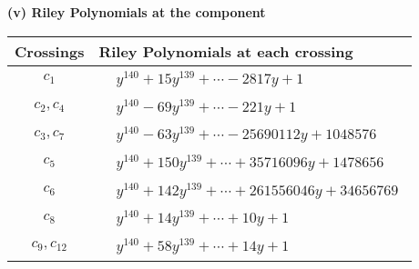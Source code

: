 \documentclass[1p]{elsarticle_modified}
\theoremstyle{definition}
\begin{document}
\newpage\renewcommand{\arraystretch}{1}
\flushleft \textbf{(v) Riley Polynomials at the component}\newline \\
\begin{tabular}{m{50pt}|m{274pt}}
Crossings & \hspace{64pt}Riley Polynomials at each crossing \\
\hline $$\begin{aligned}c_{1}\end{aligned}$$&$\begin{aligned}
&y^{140}+15 y^{139}+\cdots-2817 y+1
\end{aligned}$\\
\hline $$\begin{aligned}c_{2},c_{4}\end{aligned}$$&$\begin{aligned}
&y^{140}-69 y^{139}+\cdots-221 y+1
\end{aligned}$\\
\hline $$\begin{aligned}c_{3},c_{7}\end{aligned}$$&$\begin{aligned}
&y^{140}-63 y^{139}+\cdots-25690112 y+1048576
\end{aligned}$\\
\hline $$\begin{aligned}c_{5}\end{aligned}$$&$\begin{aligned}
&y^{140}+150 y^{139}+\cdots+35716096 y+1478656
\end{aligned}$\\
\hline $$\begin{aligned}c_{6}\end{aligned}$$&$\begin{aligned}
&y^{140}+142 y^{139}+\cdots+261556046 y+34656769
\end{aligned}$\\
\hline $$\begin{aligned}c_{8}\end{aligned}$$&$\begin{aligned}
&y^{140}+14 y^{139}+\cdots+10 y+1
\end{aligned}$\\
\hline $$\begin{aligned}c_{9},c_{12}\end{aligned}$$&$\begin{aligned}
&y^{140}+58 y^{139}+\cdots+14 y+1
\end{aligned}$\\

\end{tabular}
\end{document}

